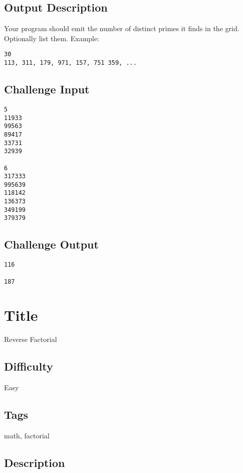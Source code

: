 \subsection{Output Description}\label{output-description-27}

Your program should emit the number of distinct primes it finds in the
grid. Optionally list them. Example:

\begin{verbatim}
30
113, 311, 179, 971, 157, 751 359, ...
\end{verbatim}

\subsection{Challenge Input}\label{challenge-input-30}

\begin{verbatim}
5 
11933
99563
89417
33731
32939

6
317333
995639
118142
136373
349199
379379
\end{verbatim}

\subsection{Challenge Output}\label{challenge-output-25}

\begin{verbatim}
116

187
\end{verbatim}

\section{Title}\label{title-37}

Reverse Factorial

\subsection{Difficulty}\label{difficulty-36}

Easy

\subsection{Tags}\label{tags-37}

math, factorial

\subsection{Description}\label{description-37}

